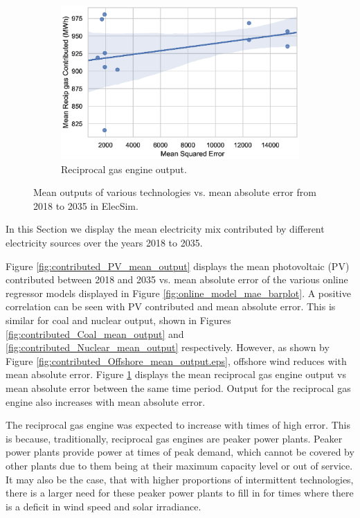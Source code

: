 \begin{figure}[h!]
\begin{subfigure}[b]{0.3\textwidth}
\includegraphics[width=1\columnwidth]{Chapter5/figures/market-forecasting/results/elecsim_results/results_2/contributed_Recip_gas_mean_output.eps}
\caption{Reciprocal gas engine output.}
\label{fig:contributed_Recip_gas_mean_output}
\end{subfigure}
\label{fig:pv_coal_nuclear_offshore_outputs}
\caption{Mean outputs of various technologies vs. mean absolute error from 2018 to 2035 in ElecSim.}
\end{figure}

In this Section we display the mean electricity mix contributed by different electricity sources over the years 2018 to 2035. 

Figure \ref{fig:contributed_PV_mean_output} displays the mean photovoltaic (PV) contributed between 2018 and 2035 vs. mean absolute error of the various online regressor models displayed in Figure \ref{fig:online_model_mae_barplot}. A positive correlation can be seen with PV contributed and mean absolute error. This is similar for coal and nuclear output, shown in Figures \ref{fig:contributed_Coal_mean_output} and \ref{fig:contributed_Nuclear_mean_output} respectively. However, as shown by Figure \ref{fig:contributed_Offshore_mean_output.eps}, offshore wind reduces with mean absolute error. Figure \ref{fig:contributed_Recip_gas_mean_output} displays the mean reciprocal gas engine output vs mean absolute error between the same time period. Output for the reciprocal gas engine also increases with mean absolute error.

The reciprocal gas engine was expected to increase with times of high error. This is because, traditionally, reciprocal gas engines are peaker power plants. Peaker power plants provide power at times of peak demand, which cannot be covered by other plants due to them being at their maximum capacity level or out of service. It may also be the case, that with higher proportions of intermittent technologies, there is a larger need for these peaker power plants to fill in for times where there is a deficit in wind speed and solar irradiance.

